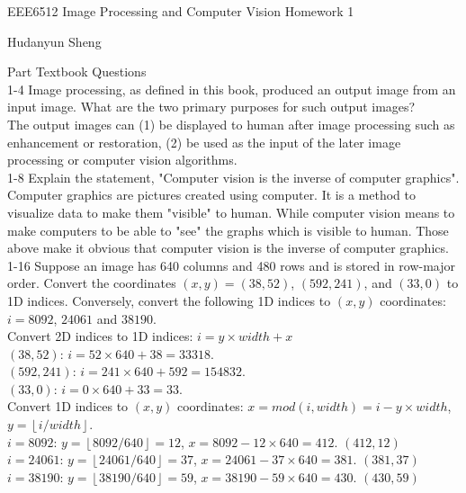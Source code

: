\documentclass[a4paper]{article}
\begin{document}
\begin{spacing}{2.0}
\begin{flushleft}\begin{huge}EEE6512  Image Processing and Computer Vision   Homework 1\end{huge}\end{flushleft}
\begin{flushright}\begin{Large} Hudanyun Sheng \end{Large}\end{flushright}
\huge{Part \uppercase\expandafter{} Textbook Questions}\\
\normalsize
	1-4 Image processing, as defined in this book, produced an output image from an input image. What are the two primary purposes for such output images?\\
	
	      The output images can (1) be displayed to human after image processing such as enhancement or restoration, (2) be used as the input of the later image processing or computer vision algorithms.\\
	      
	1-8 Explain the statement, "Computer vision is the inverse of computer graphics".\\
	
	      Computer graphics are pictures created using computer. It is a method to visualize data to make them "visible" to human. While computer vision means to make computers to be able to "see" the graphs which is visible to human. Those above make it obvious that computer vision is the inverse of computer graphics.\\
	      
	1-16 Suppose an image has 640 columns and 480 rows and is stored in row-major order. Convert the coordinates $(x,y) = (38,52)$, $(592, 241)$, and $(33,0)$ to 1D indices. Conversely, convert the following 1D indices to $(x,y)$ coordinates: $i = 8092$, $24061$ and $38190$.\\
		Convert 2D indices to 1D indices: $i = y \times width + x$\\
		$(38,52)$: $i = 52 \times 640 + 38 = 33318$.\\
		$(592, 241)$: $i = 241 \times 640 + 592 = 154832$.\\
		$(33,0)$: $i = 0 \times 640 + 33 = 33$.\\
		Convert 1D indices to $(x,y)$ coordinates: $x = mod(i, width) = i - y \times width$, $y = \left \lfloor i/width\right \rfloor$.\\
		$i = 8092$: $y = \left \lfloor 8092/640\right \rfloor = 12$, $x = 8092 - 12 \times 640 = 412$. $(412, 12)$\\
		$i = 24061$: $y = \left\lfloor 24061/640 \right \rfloor = 37$, $x = 24061 - 37 \times 640 = 381$. $(381, 37)$\\
		$i = 38190$: $y = \left\lfloor 38190/640 \right \rfloor = 59$, $x = 38190 - 59 \times 640 = 430$. $(430, 59)$\\
		

\end{spacing}
\end{document}
